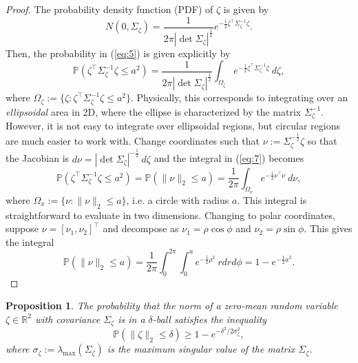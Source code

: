\documentclass[12pt]{article}
\newtheorem{prop}{Proposition}
\begin{document}
\begin{proof}
	The probability density function (PDF) of $\zeta$ is given by
	\begin{equation}
	N(0,\Sigma_{\zeta}) = \frac{1}{2\pi|\det\Sigma_{\zeta}|^{\frac{1}{2}}}e^{-\frac{1}{2}\zeta^\intercal\Sigma_{\zeta}^{-1}\zeta}.
	\end{equation}
	Then, the probability in (\ref{eq:5}) is given explicitly by
	\begin{equation}\label{eq:7}
	\mathbb{P}(\zeta^\intercal\Sigma_{\zeta}^{-1}\zeta \leq a^2) = \frac{1}{2\pi|\det\Sigma_{\zeta}|^{\frac{1}{2}}}\int_{\Omega_{\zeta}} e^{-\frac{1}{2}\zeta^\intercal\Sigma_{\zeta}^{-1}\zeta} \ d\zeta,
	\end{equation}
	where $\Omega_{\zeta} := \{\zeta: \zeta^\intercal \Sigma_{\zeta}^{-1} \zeta \leq a^2\}$.
	Physically, this corresponds to integrating over an \textit{ellipsoidal} area in 2D, where the ellipse is characterized by the matrix $\Sigma_{\zeta}^{-1}$. However, it is not easy to integrate over ellipsoidal regions, but circular regions are much easier to work with. Change coordinates such that $\nu := \Sigma_{\zeta}^{-\frac{1}{2}}\zeta$ so that the Jacobian is $d\nu = |\det \Sigma_{\zeta}|^{-\frac{1}{2}} \ d\zeta$ and the integral in (\ref{eq:7}) becomes
	\begin{equation}
	\mathbb{P}(\zeta^\intercal\Sigma_{\zeta}^{-1}\zeta \leq a^2) = \mathbb{P}(\|\nu\|_2 \leq a) = \frac{1}{2\pi} \int_{\Omega_{\nu}}e^{-\frac{1}{2}\nu^\intercal \nu} \ d\nu,
	\end{equation}
	where $\Omega_x := \{\nu: \|\nu\|_2 \leq a\}$, i.e. a circle with radius $a$. This integral is straightforward to evaluate in two dimensions. Changing to polar coordinates, suppose $\nu = [\nu_1, \nu_2]^\intercal$ and decompose as $\nu_1 = \rho \cos\phi$ and $\nu_2 = \rho \sin\phi$. This gives the integral
	\begin{equation}\label{eq:9}
	\mathbb{P}(\|\nu\|_2 \leq a) = \frac{1}{2\pi}\int_{0}^{2\pi}\int_{0}^{a}e^{-\frac{1}{2}\rho^2} \ rdrd\phi = 1 - e^{-\frac{1}{2}a^2}.
	\end{equation}
\end{proof}

\begin{prop}
	The probability that the norm of a zero-mean random variable $\zeta\in\mathbb{R}^2$ with covariance $\Sigma_{\zeta}$ is in a $\delta$-ball satisfies the inequality
	\begin{equation}
	\mathbb{P}(\|\zeta\|_2 \leq \delta) \geq 1 - e^{-\delta^2/2\sigma_{\zeta}^2},
	\end{equation}
	where $\sigma_{\zeta} := \lambda_{\mathrm{max}}(\Sigma_{\zeta})$ is the maximum singular value of the matrix $\Sigma_{\zeta}$.
\end{prop}
\end{document}
